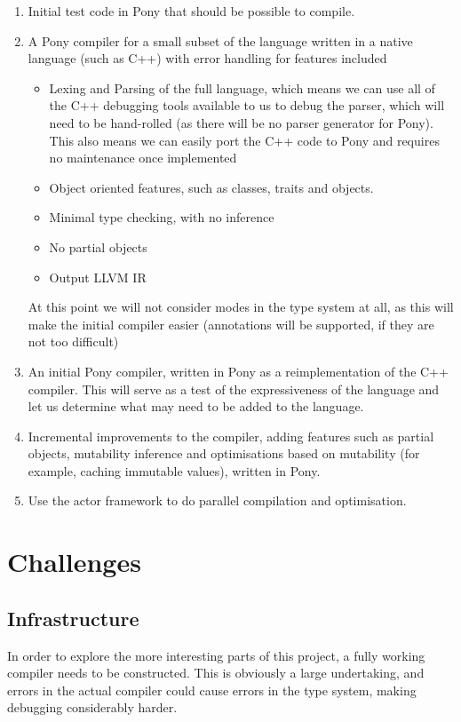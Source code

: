 \documentclass[pdftex,11pt,a4paper]{report}
\begin{document}
\begin{enumerate}
	\item Initial test code in Pony that should be possible to compile.
	\item A Pony compiler for a small subset of the language written in a native language (such as C++) with error handling for features included
		\begin{itemize}
			\item Lexing and Parsing of the full language, which means we can use all of the C++ debugging tools available to us to debug the parser, which will need to be hand-rolled (as there will be no parser generator for Pony).
				This also means we can easily port the C++ code to Pony and requires no maintenance once implemented
			\item Object oriented features, such as classes, traits and objects.
			\item Minimal type checking, with no inference
			\item No partial objects
			\item Output LLVM IR
		\end{itemize}
	At this point we will not consider modes in the type system at all, as this will make the initial compiler easier (annotations will be supported, if they are not too difficult)
	\item An initial Pony compiler, written in Pony as a reimplementation of the C++ compiler.
		This will serve as a test of the expressiveness of the language and let us determine what may need to be added to the language.
	\item Incremental improvements to the compiler, adding features such as partial objects, mutability inference and optimisations based on mutability (for example, caching immutable values), written in Pony.
    	\item Use the actor framework to do parallel compilation and optimisation.
\end{enumerate}

\section{Challenges}

\subsection{Infrastructure}

In order to explore the more interesting parts of this project, a fully working compiler needs to be constructed.
This is obviously a large undertaking, and errors in the actual compiler could cause errors in the type system, making debugging considerably harder.
\end{document}
